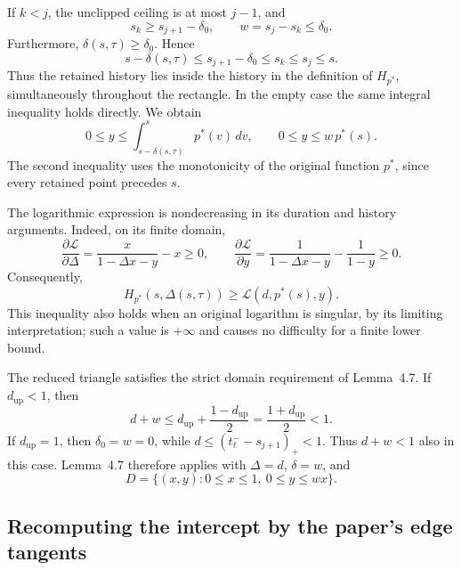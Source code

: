 \documentclass[11pt,a4paper]{article}
\begin{document}
If $k<j$, the unclipped ceiling is at most $j-1$, and
\[
 s_k\ge s_{j+1}-\delta_0,
 \qquad
 w=s_j-s_k\le\delta_0.
\]
Furthermore, $\delta(s,\tau)\ge\delta_0$.  Hence
\[
 s-\delta(s,\tau)
 \le s_{j+1}-\delta_0
 \le s_k\le s_j\le s.
\]
Thus the retained history lies inside the history in the definition
of $H_{p^*}$, simultaneously throughout the rectangle.  In the empty
case the same integral inequality holds directly.  We obtain
\[
 0\le y\le
 \int_{s-\delta(s,\tau)}^s p^*(v)\,dv,
 \qquad
 0\le y\le w\,p^*(s).
\]
The second inequality uses the monotonicity of the original function
$p^*$, since every retained point precedes $s$.

The logarithmic expression is nondecreasing in its duration and
history arguments.  Indeed, on its finite domain,
\[
 \frac{\partial\mathcal L}{\partial\Delta}
 =\frac{x}{1-\Delta x-y}-x\ge0,
 \qquad
 \frac{\partial\mathcal L}{\partial y}
 =\frac1{1-\Delta x-y}-\frac1{1-y}\ge0.
\]
Consequently,
\[
 H_{p^*}(s,\Delta(s,\tau))
 \ge \mathcal L(d,p^*(s),y).
\]
This inequality also holds when an original logarithm is singular,
by its limiting interpretation; such a value is $+\infty$ and causes
no difficulty for a finite lower bound.

The reduced triangle satisfies the strict domain requirement of
Lemma~4.7.  If $d_{\mathrm{up}}<1$, then
\[
 d+w\le d_{\mathrm{up}}+\frac{1-d_{\mathrm{up}}}2
       =\frac{1+d_{\mathrm{up}}}2<1.
\]
If $d_{\mathrm{up}}=1$, then $\delta_0=w=0$, while
$d\le(t_\ell^- -s_{j+1})_+<1$.  Thus $d+w<1$ also in this case.
Lemma~4.7 therefore applies with $\Delta=d$, $\delta=w$, and
\[
 D=\{(x,y):0\le x\le1,\ 0\le y\le wx\}.
\]

\subsection{Recomputing the intercept by the paper's edge tangents}
\end{document}

